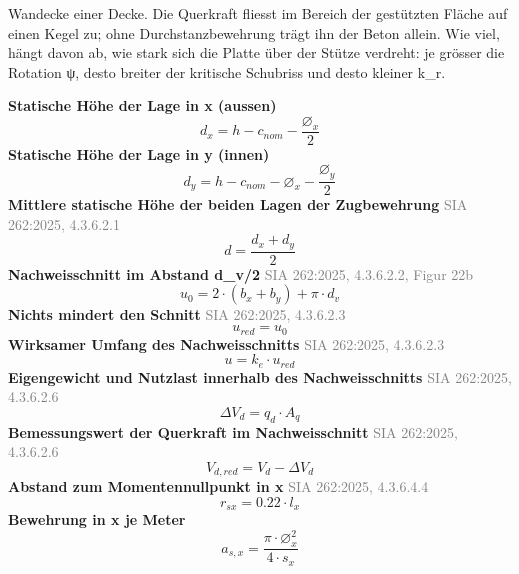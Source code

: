 \documentclass[11pt,a4paper]{article}
\newcommand{\normref}[1]{{\small\textcolor{gray}{#1}}}
\begin{document}
Wandecke einer Decke. Die Querkraft fliesst im Bereich der gestützten Fläche auf einen Kegel zu; ohne Durchstanzbewehrung trägt ihn der Beton allein. Wie viel, hängt davon ab, wie stark sich die Platte über der Stütze verdreht: je grösser die Rotation ψ, desto breiter der kritische Schubriss und desto kleiner k\_r.

\noindent\textbf{Statische Höhe der Lage in x (aussen)}
\begin{equation*}
d_x = h - c_{nom} - \frac{\varnothing_x}{2}
\end{equation*}
\noindent\textbf{Statische Höhe der Lage in y (innen)}
\begin{equation*}
d_y = h - c_{nom} - \varnothing_x - \frac{\varnothing_y}{2}
\end{equation*}
\noindent\textbf{Mittlere statische Höhe der beiden Lagen der Zugbewehrung} \hfill \normref{SIA 262:2025, 4.3.6.2.1}
\begin{equation*}
d = \frac{d_x + d_y}{2}
\end{equation*}
\noindent\textbf{Nachweisschnitt im Abstand d\_v/2} \hfill \normref{SIA 262:2025, 4.3.6.2.2, Figur 22b}
\begin{equation*}
u_0 = 2 \cdot \left(b_x + b_y\right) + \pi \cdot d_v
\end{equation*}
\noindent\textbf{Nichts mindert den Schnitt} \hfill \normref{SIA 262:2025, 4.3.6.2.3}
\begin{equation*}
u_{red} = u_0
\end{equation*}
\noindent\textbf{Wirksamer Umfang des Nachweisschnitts} \hfill \normref{SIA 262:2025, 4.3.6.2.3}
\begin{equation*}
u = k_e \cdot u_{red}
\end{equation*}
\noindent\textbf{Eigengewicht und Nutzlast innerhalb des Nachweisschnitts} \hfill \normref{SIA 262:2025, 4.3.6.2.6}
\begin{equation*}
\Delta V_d = q_d \cdot A_q
\end{equation*}
\noindent\textbf{Bemessungswert der Querkraft im Nachweisschnitt} \hfill \normref{SIA 262:2025, 4.3.6.2.6}
\begin{equation*}
V_{d,red} = V_d - \Delta V_d
\end{equation*}
\noindent\textbf{Abstand zum Momentennullpunkt in x} \hfill \normref{SIA 262:2025, 4.3.6.4.4}
\begin{equation*}
r_{sx} = 0.22 \cdot l_x
\end{equation*}
\noindent\textbf{Bewehrung in x je Meter}
\begin{equation*}
a_{s,x} = \frac{\pi \cdot \varnothing_x^{2}}{4 \cdot s_x}
\end{equation*}
\end{document}
